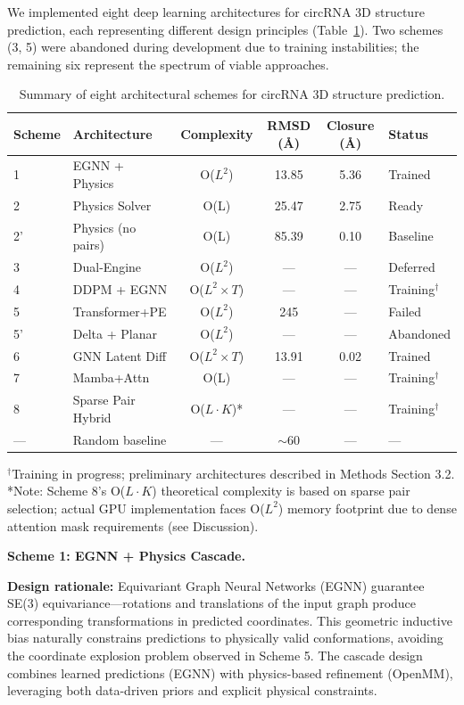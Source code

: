\documentclass[12pt]{article}
\begin{document}
We implemented eight deep learning architectures for circRNA 3D structure prediction, each representing different design principles (Table~\ref{tab:schemes}). Two schemes (3, 5) were abandoned during development due to training instabilities; the remaining six represent the spectrum of viable approaches.

\begin{table}[htbp]
\centering
\caption{Summary of eight architectural schemes for circRNA 3D structure prediction.}
\label{tab:schemes}
\begin{tabular}{llcccl}
\toprule
Scheme & Architecture & Complexity & RMSD (\AA) & Closure (\AA) & Status \\
\midrule
1 & EGNN + Physics & O($L^2$) & 13.85 & 5.36 & Trained \\
2 & Physics Solver & O(L) & 25.47 & 2.75 & Ready \\
2' & Physics (no pairs) & O(L) & 85.39 & 0.10 & Baseline \\
3 & Dual-Engine & O($L^2$) & --- & --- & Deferred \\
4 & DDPM + EGNN & O($L^2 \times T$) & --- & --- & Training$^{\dagger}$ \\
5 & Transformer+PE & O($L^2$) & 245 & --- & Failed \\
5' & Delta + Planar & O($L^2$) & --- & --- & Abandoned \\
6 & GNN Latent Diff & O($L^2 \times T$) & 13.91 & 0.02 & Trained \\
7 & Mamba+Attn & O(L) & --- & --- & Training$^{\dagger}$ \\
8 & Sparse Pair Hybrid & O($L \cdot K$)* & --- & --- & Training$^{\dagger}$ \\
\midrule
--- & Random baseline & --- & $\sim$60 & --- & --- \\
\bottomrule
\end{tabular}
\footnotesize
$^{\dagger}$Training in progress; preliminary architectures described in Methods Section 3.2.\\
*Note: Scheme 8's O($L \cdot K$) theoretical complexity is based on sparse pair selection; actual GPU implementation faces O($L^2$) memory footprint due to dense attention mask requirements (see Discussion).
\end{table}

\textbf{Scheme 1: EGNN + Physics Cascade.}

\textbf{Design rationale:} Equivariant Graph Neural Networks (EGNN) \citep{satorras2021} guarantee SE(3) equivariance---rotations and translations of the input graph produce corresponding transformations in predicted coordinates. This geometric inductive bias naturally constrains predictions to physically valid conformations, avoiding the coordinate explosion problem observed in Scheme 5. The cascade design combines learned predictions (EGNN) with physics-based refinement (OpenMM), leveraging both data-driven priors and explicit physical constraints.
\end{document}
